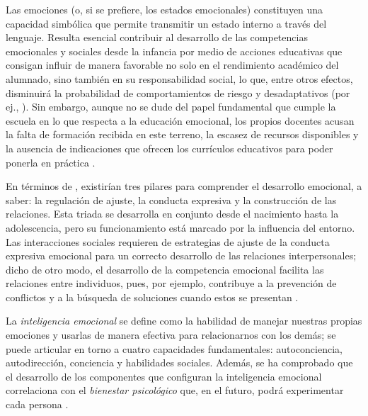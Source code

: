 \documentclass[spanish]{textolivre}
\begin{document}
Las emociones (o, si se prefiere, los estados emocionales) constituyen una capacidad simbólica que permite transmitir un estado interno a través del lenguaje. Resulta esencial contribuir al desarrollo de las competencias emocionales y sociales desde la infancia por medio de acciones educativas que consigan influir de manera favorable no solo en el rendimiento académico del alumnado, sino también en su responsabilidad social, lo que, entre otros efectos, disminuirá la probabilidad de comportamientos de riesgo y desadaptativos (por ej., \textcite{bjorklund_together_2014,brackett_emotional_2004,Cornell_2017}). Sin embargo, aunque no se dude del papel fundamental que cumple la escuela en lo que respecta a la educación emocional, los propios docentes acusan la falta de formación recibida en este terreno, la escasez de recursos disponibles y la ausencia de indicaciones que ofrecen los currículos educativos para poder ponerla en práctica \cite{trujillo_gonzalez_papel_2020}. 

En términos de \textcite{saarni_development_1999}, existirían tres pilares para comprender el desarrollo emocional, a saber: la regulación de ajuste, la conducta expresiva y la construcción de las relaciones. Esta triada se desarrolla en conjunto desde el nacimiento hasta la adolescencia, pero su funcionamiento está marcado por la influencia del entorno. Las interacciones sociales requieren de estrategias de ajuste de la conducta expresiva emocional para un correcto desarrollo de las relaciones interpersonales; dicho de otro modo, el desarrollo de la competencia emocional facilita las relaciones entre individuos, pues, por ejemplo, contribuye a la prevención de conflictos y a la búsqueda de soluciones cuando estos se presentan \cite{gutierrez_ensenanza_2019}. 

La \textit{inteligencia emocional} \cite{goleman_inteligencia_2021} se define como la habilidad de manejar nuestras propias emociones y usarlas de manera efectiva para relacionarnos con los demás; se puede articular en torno a cuatro capacidades fundamentales: autoconciencia, autodirección, conciencia y habilidades sociales. Además, se ha comprobado que el desarrollo de los componentes que configuran la inteligencia emocional correlaciona con el \textit{bienestar psicológico} que, en el futuro, podrá experimentar cada persona \cite{pimpe_2023}. 
\end{document}
